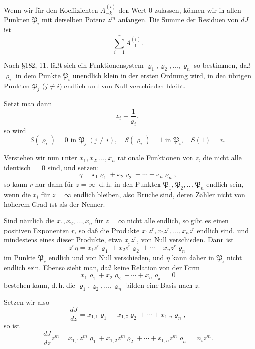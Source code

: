 \documentclass[12pt,a4paper]{article}
\begin{document}
Wenn wir für den Koeffizienten $A_{-k}^{(i)}$ den Wert $0$ zulassen, können wir in allen Punkten $\mathfrak{P}_i$ mit derselben Potenz $z^m$ anfangen. Die Summe der Residuen von $dJ$ ist
\[
\sum_{i=1}^r A_{-1}^{(i)}.
\]

Nach \S 182, 11. läßt sich ein Funktionensystem $\varrho_1, \varrho_2, \ldots, \varrho_n$ so bestimmen, daß $\varrho_i$ in dem Punkte $\mathfrak{P}_i$ unendlich klein in der ersten Ordnung wird, in den übrigen Punkten $\mathfrak{P}_j$ ($j \neq i$) endlich und von Null verschieden bleibt.

Setzt man dann
\[
z_i = \frac{1}{\varrho_i},
\]
so wird
\begin{equation}\label{eq:201-6}
S(\varrho_i) = 0 \text{ in } \mathfrak{P}_j\ (j \neq i), \quad S(\varrho_i) = 1 \text{ in } \mathfrak{P}_i, \quad S(1) = n.
\end{equation}

Verstehen wir nun unter $x_1, x_2, \ldots, x_n$ rationale Funktionen von $z$, die nicht alle identisch $= 0$ sind, und setzen:
\begin{equation}\label{eq:201-7}
\eta = x_1 \varrho_1 + x_2 \varrho_2 + \cdots + x_n \varrho_n,
\end{equation}
so kann $\eta$ nur dann für $z = \infty$, d.\,h. in den Punkten $\mathfrak{P}_1, \mathfrak{P}_2, \ldots, \mathfrak{P}_n$ endlich sein, wenn die $x_i$ für $z = \infty$ endlich bleiben, also Brüche sind, deren Zähler nicht von höherem Grad ist als der Nenner.

Sind nämlich die $x_1, x_2, \ldots, x_n$ für $z = \infty$ nicht alle endlich, so gibt es einen positiven Exponenten $r$, so daß die Produkte $x_1 z^r, x_2 z^r, \ldots, x_n z^r$ endlich sind, und mindestens eines dieser Produkte, etwa $x_s z^r$, von Null verschieden. Dann ist
\[
z^r \eta = x_1 z^r \varrho_1 + x_2 z^r \varrho_2 + \cdots + x_n z^r \varrho_n
\]
im Punkte $\mathfrak{P}_s$ endlich und von Null verschieden, und $\eta$ kann daher in $\mathfrak{P}_s$ nicht endlich sein. Ebenso sieht man, daß keine Relation von der Form
\[
x_1 \varrho_1 + x_2 \varrho_2 + \cdots + x_n \varrho_n = 0
\]
bestehen kann, d.\,h. die $\varrho_1, \varrho_2, \ldots, \varrho_n$ bilden eine Basis nach $z$.

Setzen wir also
\begin{equation}\label{eq:201-8}
\frac{dJ}{dz} = x_{1,1} \varrho_1 + x_{1,2} \varrho_2 + \cdots + x_{1,n} \varrho_n,
\end{equation}
so ist
\[
\frac{dJ}{dz} z^m = x_{1,1} z^m \varrho_1 + x_{1,2} z^m \varrho_2 + \cdots + x_{1,n} z^m \varrho_n = n_i z^m.
\]
\end{document}
